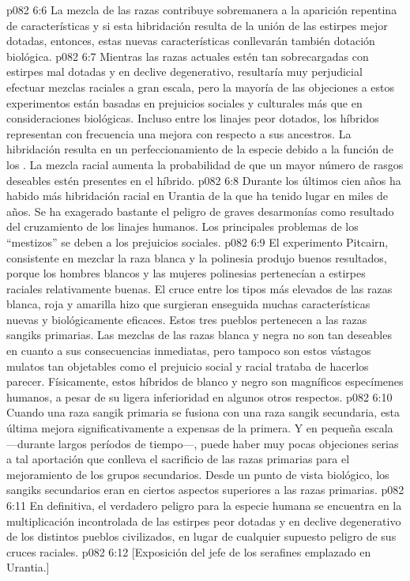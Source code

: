\vs p082 6:6 La mezcla de las razas contribuye sobremanera a la aparición repentina de características  y si esta hibridación resulta de la unión de las estirpes mejor dotadas, entonces, estas nuevas características conllevarán también  dotación biológica.
\vs p082 6:7 Mientras las razas actuales estén tan sobrecargadas con estirpes mal dotadas y en declive degenerativo, resultaría muy perjudicial efectuar mezclas raciales a gran escala, pero la mayoría de las objeciones a estos experimentos están basadas en prejuicios sociales y culturales más que en consideraciones biológicas. Incluso entre los linajes peor dotados, los híbridos representan con frecuencia una mejora con respecto a sus ancestros. La hibridación resulta en un perfeccionamiento de la especie debido a la función de los . La mezcla racial aumenta la probabilidad de que un mayor número de rasgos  deseables estén presentes en el híbrido.
\vs p082 6:8 \pc Durante los últimos cien años ha habido más hibridación racial en Urantia de la que ha tenido lugar en miles de años. Se ha exagerado bastante el peligro de graves desarmonías como resultado del cruzamiento de los linajes humanos. Los principales problemas de los “mestizos” se deben a los prejuicios sociales.
\vs p082 6:9 El experimento Pitcairn, consistente en mezclar la raza blanca y la polinesia produjo buenos resultados, porque los hombres blancos y las mujeres polinesias pertenecían a estirpes raciales relativamente buenas. El cruce entre los tipos más elevados de las razas blanca, roja y amarilla hizo que surgieran enseguida muchas características nuevas y biológicamente eficaces. Estos tres pueblos pertenecen a las razas sangiks primarias. Las mezclas de las razas blanca y negra no son tan deseables en cuanto a sus consecuencias inmediatas, pero tampoco son estos vástagos mulatos tan objetables como el prejuicio social y racial trataba de hacerlos parecer. Físicamente, estos híbridos de blanco y negro son magníficos especímenes humanos, a pesar de su ligera inferioridad en algunos otros respectos.
\vs p082 6:10 \pc Cuando una raza sangik primaria se fusiona con una raza sangik secundaria, esta última mejora significativamente a expensas de la primera. Y en pequeña escala ---durante largos períodos de tiempo---, puede haber muy pocas objeciones serias a tal aportación que conlleva el sacrificio de las razas primarias para el mejoramiento de los grupos secundarios. Desde un punto de vista biológico, los sangiks secundarios eran en ciertos aspectos superiores a las razas primarias.
\vs p082 6:11 En definitiva, el verdadero peligro para la especie humana se encuentra en la multiplicación incontrolada de las estirpes peor dotadas y en declive degenerativo de los distintos pueblos civilizados, en lugar de cualquier supuesto peligro de sus cruces raciales.
\vsetoff
\vs p082 6:12 [Exposición del jefe de los serafines emplazado en Urantia.]
